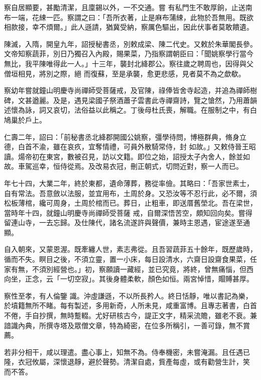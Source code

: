 \begin{pinyinscope}
 察自居顯要，甚勵清潔，且廩錫以外，一不交通。嘗
 有私門生不敢厚餉，止送南布一端，花綀一匹。察謂之曰：「吾所衣著，止是麻布蒲綀，此物於吾無用。既欲相款接，幸不煩爾。」此人遜請，猶冀受納，察厲色驅出，因此伏事者莫敢饋遺。



 陳滅，入隋，開皇九年，詔授秘書丞，別敕成梁、陳二代史。又敕於朱華閣長參。文帝知察蔬菲，別日乃獨召入內殿，賜果菜，乃指察謂朝臣曰：「聞姚察學行當今無比，我平陳唯得此一人。」十三年，襲封北絳郡公。察往歲之聘周也，因得與父僧垣相見，將別之際，絕
 而復蘇，至是承襲，愈更悲感，見者莫不為之歔欷。



 察幼年嘗就鐘山明慶寺尚禪師受菩薩戒，及官陳，祿俸皆舍寺起造，并追為禪師樹碑，文甚遒麗。及是，遇見梁國子祭酒蕭子雲書此寺禪齋詩，覽之愴然，乃用蕭韻述懷為詠，詞又哀切，法俗益以此稱之。丁後母杜氏喪，解職。在服制之中，有白鳩巢於戶上。



 仁壽二年，詔曰：「前秘書丞北絳郡開國公姚察，彊學待問，博極群典，脩身立德，白首不渝，雖在哀疚，宜奪情禮，可員外散騎常侍，封
 如故。」又敕侍晉王昭讀。煬帝初在東宮，數被召見，訪以文籍。即位之始，詔授太子內舍人，餘並如故。車駕巡幸，恒侍從焉。及改易衣冠，刪正朝式，切問近對，察一人而已。



 年七十四，大業二年，終於東都，遺命薄葬，務從率儉。其略曰：「吾家世素士，自有常法。吾意斂以法服，並宜用布，土周於身。又恐汝等不忍行此，必不爾，須松板薄棺，纔可周身，土周於棺而已。葬日，止粗車，即送厝舊塋北。吾在梁世，當時年十四，就鐘山明慶寺尚禪師受菩薩
 戒，自爾深悟苦空，頗知回向矣。嘗得留連山寺，一去忘歸。及仕陳代，諸名流遂許與聲價，兼時主恩遇，宦途遂至通顯。



 自入朝來，又蒙恩渥。既牽纏人世，素志弗從。且吾習蔬菲五十餘年，既歷歲時，循而不失。瞑目之後，不須立靈，置一小床，每日設清水，六齋日設齋食果菜，任家有無，不須別經營也。」初，察願讀一藏經，並已究竟，將終，曾無痛惱，但西向坐，正念，云「一切空寂」。其後身體柔軟，顏色如恒。兩宮悼惜，賵賻甚厚。



 察性至孝，有人倫鑒
 識。沖虛謙遜，不以所長矜人。終日恬靜，唯以書記為樂，於墳籍無所不睹。每有製述，多用新奇，人所未見，咸重富博。且專志著書，白首不倦，手自抄撰，無時蹔輟。尤好研核古今，諟正文字，精采流贍，雖老不衰。兼諳識內典，所撰寺塔及眾僧文章，特為綺密，在位多所稱引，一善可錄，無不賞薦。



 若非分相干，咸以理遣。盡心事上，知無不為。侍奉機密，未嘗淹漏。且任遇已隆，衣冠攸屬，深懷退靜，避於聲勢。清潔自處，貲產每虛，或有勸營生計，笑
 而不答。




\end{pinyinscope}
